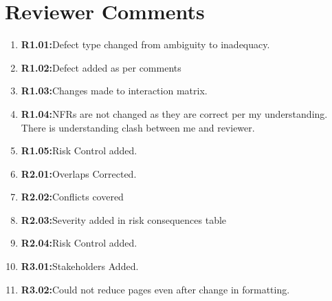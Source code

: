 \documentclass{report}
\begin{document}
\section{Reviewer Comments}
\color{blue}
\begin{enumerate}
    \item \textbf{R1.01:}Defect type changed from ambiguity to inadequacy.
    \item \textbf{R1.02:}Defect added as per comments
    \item \textbf{R1.03:}Changes made to interaction matrix.
    \item \textbf{R1.04:}NFRs are not changed as they are correct per my understanding. There is understanding clash between me and reviewer.
    \item \textbf{R1.05:}Risk Control added.
    \item \textbf{R2.01:}Overlaps Corrected.
    \item \textbf{R2.02:}Conflicts covered
    \item \textbf{R2.03:}Severity added in risk consequences table
    \item \textbf{R2.04:}Risk Control added.
    \item \textbf{R3.01:}Stakeholders Added.
    \item \textbf{R3.02:}Could not reduce pages even after change in formatting.
\end{enumerate}
\end{document}
